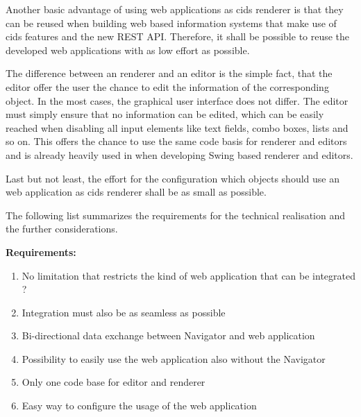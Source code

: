 
Another basic advantage of using web applications as cids renderer is that they can be reused when building web based information systems that make use of cids features and the new REST API.
Therefore, it shall be possible to reuse the developed web applications with as low effort as possible.

The difference between an renderer and an editor is the simple fact, that the editor offer the user the chance to edit the information of the corresponding object. 
In the most cases, the graphical user interface does not differ. 
The editor must simply ensure that no information can be edited, which can be easily reached when disabling all input elements like text fields, combo boxes, lists and so on. 
This offers the chance to use the same code basis for renderer and editors and is already heavily used in when developing Swing based renderer and editors.

Last but not least, the effort for the configuration which objects should use an web application as cids renderer shall be as small as possible.

The following list summarizes the requirements for the technical realisation and the further considerations.

\textbf{Requirements:}
\begin{enumerate}
\item No limitation that restricts the kind of web application that can be integrated ?
\item Integration must also be as seamless as possible 
\item Bi-directional data exchange between Navigator and web application
\item Possibility to easily use the web application also without the Navigator
\item Only one code base for editor and renderer
\item Easy way to configure the usage of the web application
\end{enumerate} 


